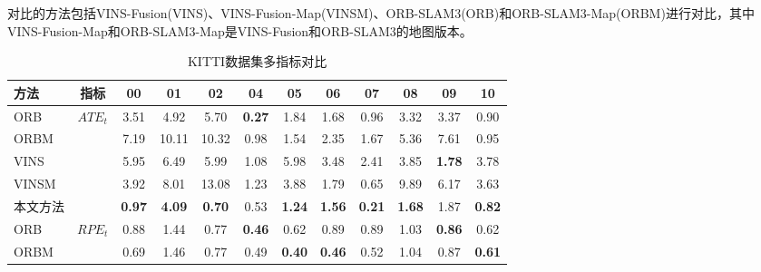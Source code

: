 对比的方法包括VINS-Fusion(VINS)、VINS-Fusion-Map(VINSM)、ORB-SLAM3(ORB)和ORB-SLAM3-Map(ORBM)进行对比，其中VINS-Fusion-Map和ORB-SLAM3-Map是VINS-Fusion和ORB-SLAM3的地图版本。

\begin{table}
\centering
\begin{threeparttable}
\caption{KITTI数据集多指标对比}
\begin{tabular}{lccccccccccc}
\toprule
方法    & 指标                    & 00            & 01            & 02            & 04            & 05            & 06            & 07            & 08            & 09            & 10            \\ \midrule
ORB   & \multirow{5}{*}{$ATE_t$\textdownarrow{}}  & 3.51          & 4.92          & 5.70          & \cellcolor[HTML]{FFCCC9}\textbf{0.27} & 1.84          & 1.68          & 0.96          & 3.32          & 3.37          & 0.90          \\
ORBM  &                       & 7.19          & 10.11         & 10.32         & 0.98          & 1.54          & 2.35          & 1.67          & 5.36          & 7.61          & 0.95          \\
VINS  &                       & 5.95          & 6.49          & 5.99          & 1.08          & 5.98          & 3.48          & 2.41          & 3.85          & \cellcolor[HTML]{FFCCC9}\textbf{1.78}          & 3.78          \\
VINSM &                       & 3.92          & 8.01          & 13.08         & 1.23          & 3.88          & 1.79          & 0.65          & 9.89          & 6.17          & 3.63          \\
本文方法    &                       & \cellcolor[HTML]{FFCCC9}\textbf{0.97} & \cellcolor[HTML]{FFCCC9}\textbf{4.09} & \cellcolor[HTML]{FFCCC9}\textbf{0.70} & 0.53          & \cellcolor[HTML]{FFCCC9}\textbf{1.24} & \cellcolor[HTML]{FFCCC9}\textbf{1.56} & \cellcolor[HTML]{FFCCC9}\textbf{0.21} & \cellcolor[HTML]{FFCCC9}\textbf{1.68} & 1.87 & \cellcolor[HTML]{FFCCC9}\textbf{0.82} \\ \midrule
ORB   & \multirow{5}{*}{$RPE_t$\textdownarrow{}} & 0.88          & 1.44          & 0.77          & \cellcolor[HTML]{FFCCC9}\textbf{0.46} & 0.62          & 0.89          & 0.89          & 1.03          & \cellcolor[HTML]{FFCCC9}\textbf{0.86} & 0.62          \\
ORBM  &                       & 0.69          & 1.46          & 0.77          & 0.49          & \cellcolor[HTML]{FFCCC9}\textbf{0.40} & \cellcolor[HTML]{FFCCC9}\textbf{0.46} & 0.52          & 1.04          & 0.87          & \cellcolor[HTML]{FFCCC9}\textbf{0.61} \\

\end{tabular}
\end{threeparttable}
\end{table}
